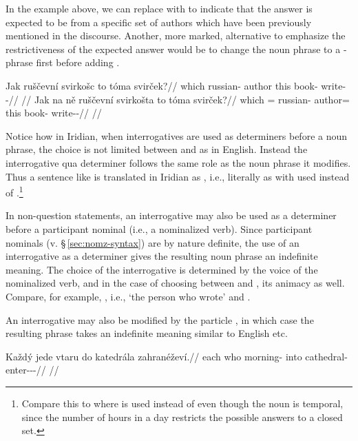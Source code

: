 In the example above, we can replace  with  to
indicate that the answer is expected to be from a specific set of authors which
have been previously mentioned in the discourse. Another, more marked,
alternative to emphasize the restrictiveness of the expected answer would be to
change the noun phrase to a -phrase first before adding .

\pex
\a\begingl
\gla Jak ruščevní svirkošc to tóma svirček?//
\glb which russian-\Att{} author this book-\Acc{} write-\Av{}-\Pf{}//
\glft {}//
\endgl
\a\begingl
\gla Jak na ně ruščevní svirkošta to tóma svirček?//
\glb which \Loc{} \Pl{}= russian-\Att{} author=\Acc{} this book-\Acc{} write-\Av{}-\Pf{}//
\glft {}//
\endgl
\xe

Notice how in Iridian, when interrogatives are used as determiners before a noun
phrase, the choice is not limited between  and  as in
English. Instead the interrogative qua determiner follows the same role as the
noun phrase it modifies. Thus a sentence like 
is translated in Iridian as , i.e., literally as
 with  used instead of
.\footnote{Compare this to  where
 is used instead of  even though the noun  is
temporal, since the number of hours in a day restricts the possible answers to a
closed set.}

In non-question statements, an interrogative may also be used as a determiner
before a participant nominal (i.e., a nominalized verb). Since participant
nominals (v. \S\,\ref{sec:nomz-syntax}) are by nature definite, the use of an
interrogative as a determiner gives the resulting noun phrase an indefinite
meaning. The choice of the interrogative is determined by the voice of the
nominalized verb, and in the case of choosing between  and ,
its animacy as well. Compare, for example,
, i.e., `the person who wrote' and
.

An interrogative may also be modified by the particle , in which case the resulting phrase takes an indefinite meaning similar to
English   etc.

\pex
\begingl
\gla Každý jede vtaru do katedrála zahranéževí.//
\glb each who morning-\Ins{} into cathedral-\Acc{} enter-\Pot{}-\Av{}-\Prog{}//
\glft {}//
\endgl
\xe

